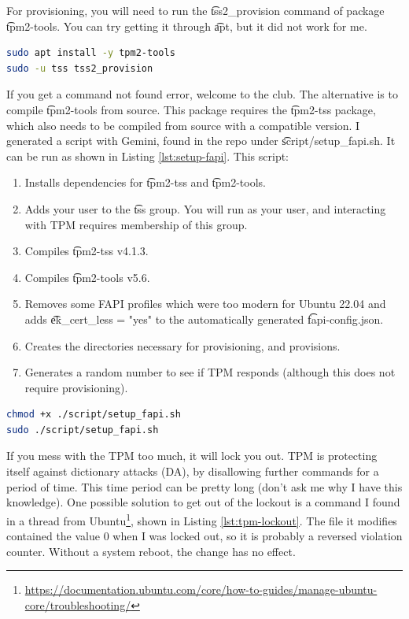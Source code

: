 For provisioning, you will need to run the \t{tss2\_provision} command of package \t{tpm2-tools}.
You can try getting it through \t{apt}, but it did not work for me.
\begin{lstlisting}[language=bash]
sudo apt install -y tpm2-tools
sudo -u tss tss2_provision
\end{lstlisting}

If you get a command not found error, welcome to the club.
The alternative is to compile \t{tpm2-tools} from source.
This package requires the \t{tpm2-tss} package, which also needs to be compiled from source with a compatible version.
I generated a script with Gemini, found in the repo under \t{script/setup\_fapi.sh}.
It can be run as shown in Listing \ref{lst:setup-fapi}.
This script:
\begin{enumerate}
  \item Installs dependencies for \t{tpm2-tss} and \t{tpm2-tools}.
  \item Adds your user to the \t{tss} group. You will run \app{} as your user, and interacting with TPM requires membership of this group.
  \item Compiles \t{tpm2-tss v4.1.3}.
  \item Compiles \t{tpm2-tools v5.6}.
  \item Removes some FAPI profiles which were too modern for Ubuntu 22.04 and adds \t{ek\_cert\_less = "yes"} to the automatically generated \t{fapi-config.json}.
  \item Creates the directories necessary for provisioning, and provisions.
  \item Generates a random number to see if TPM responds (although this does not require provisioning).
\end{enumerate}

\begin{lstlisting}[language=bash, label={lst:setup-fapi}, caption={Running the FAPI setup script.}]
chmod +x ./script/setup_fapi.sh
sudo ./script/setup_fapi.sh
\end{lstlisting}

If you mess with the TPM too much, it will lock you out.
TPM is protecting itself against dictionary attacks (DA), by disallowing further commands for a period of time.
This time period can be pretty long (don't ask me why I have this knowledge).
One possible solution to get out of the lockout is a command I found in a thread from Ubuntu\footnote{\url{https://documentation.ubuntu.com/core/how-to-guides/manage-ubuntu-core/troubleshooting/}}, shown in Listing \ref{lst:tpm-lockout}.
The file it modifies contained the value 0 when I was locked out, so it is probably a reversed violation counter.
Without a system reboot, the change has no effect.


